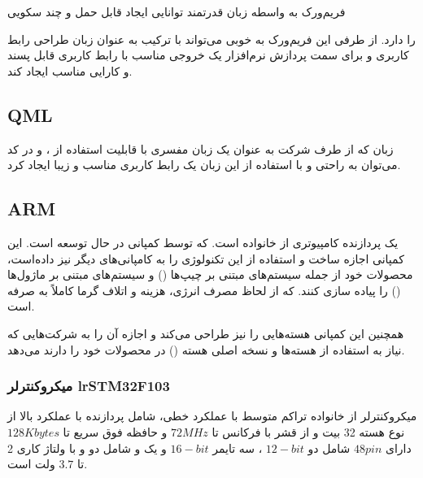 \documentclass[a4paper,12pt]{report}
\begin{document}
		فریم‌ورک
		به واسطه زبان قدرتمند
		توانایی ایجاد
		قابل حمل و چند سکویی

		را دارد.
		از طرفی این فریم‌ورک به خوبی می‌تواند با ترکیب
		به عنوان زبان طراحی رابط کاربری و
		برای سمت پردازش نرم‌افزار یک خروجی مناسب با رابط کاربری قابل پسند و کارایی مناسب ایجاد کند.
	\subsection{QML}\label{subsec2:sec5:chap1}
	زبان
	که از طرف شرکت
	به عنوان یک زبان مفسری با قابلیت استفاده از
	،
	و
	در کد می‌توان به راحتی و با استفاده از این زبان یک رابط کاربری مناسب و زیبا ایجاد کرد.
	\cite{QtQML51548:online}
	\subsection{ARM}\label{subsec3:sec5:chap1}
	یک پردازنده کامپیوتری از خانواده
	است. که توسط کمپانی
	در حال توسعه است.
	این کمپانی اجازه ساخت و استفاده از این تکنولوژی را به کامپانی‌های دیگر نیز داده‌است،‌ محصولات خود از جمله سیستم‌های مبتنی بر چیپ‌ها
	()
	و سیستم‌های مبتنی بر ماژول‌ها
	()
	را پیاده سازی کنند. که از لحاظ مصرف انرژی، هزینه و اتلاف گرما کاملاً به صرفه است.

	همچنین این کمپانی هسته‌هایی را نیز طراحی می‌کند و اجازه آن را به شرکت‌هایی که نیاز به استفاده از
	هسته‌ها و  نسخه اصلی هسته
	()
	 در محصولات خود را دارند می‌دهد.

	\subsubsection{
		میکروکنترلر
		lr{STM32F103}}
	میکروکنترلر
	از خانواده تراکم متوسط با عملکرد خطی، شامل پردازنده
	با عملکرد بالا از نوع هسته 32 بیت و از قشر
	با فرکانس تا
	$ 72 MHz $
	و حافظه فوق سریع تا
	$ 128 Kbytes $
	دارای
	$ 48 pin $
	شامل دو
	$ 12-bit $
	، سه تایمر
	$ 16-bit $
	و یک
	و شامل دو
	و
	با ولتاژ کاری 2 تا $ 3.7 $ ولت است.
	\cite{ltc3600:datasheet}
\end{document}
